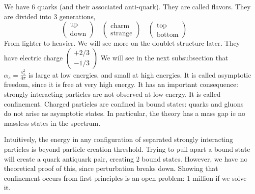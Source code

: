 \documentclass[a4paper]{book}
\theoremstyle{definition}
\theoremstyle{remark}
\begin{document}
We have 6 quarks (and their associated anti-quark). They are called flavors. They are divided into 3 generations, 
\begin{equation}
    \begin{pmatrix}
        \text{up} \\ \text{down}
    \end{pmatrix} \quad 
    \begin{pmatrix}
        \text{charm} \\ \text{strange}
    \end{pmatrix} \quad 
    \begin{pmatrix}
        \text{top} \\ \text{bottom}
    \end{pmatrix} \quad 
\end{equation}
From lighter to heavier. We will see more on the doublet structure later. They have electric charge $\begin{pmatrix}
    +2/3 \\ -1/3
\end{pmatrix}$
We will see in the next subsubsection that $\alpha_s = \frac{g_s^2}{4\pi}$ is large at low energies, and small at high energies. It is called asymptotic freedom, since it is free at very high energy. It has an important consequence: strongly interacting particles are not observed at low energy. It is called confinement. Charged particles are confined in bound states: quarks and gluons do not arise as asymptotic states. In particular, the theory has a mass gap ie no massless states in the spectrum.\par \medskip 

Intuitively, the energy in any configuration of separated strongly interacting particles is beyond particle creation threshold. Trying to pull apart a bound state will create a quark antiquark pair, creating 2 bound states. However, we have no theoretical proof of this, since perturbation breaks down. Showing that confinement occurs from first principles is an open problem: 1 million if we solve it. \par \medskip 
\end{document}
